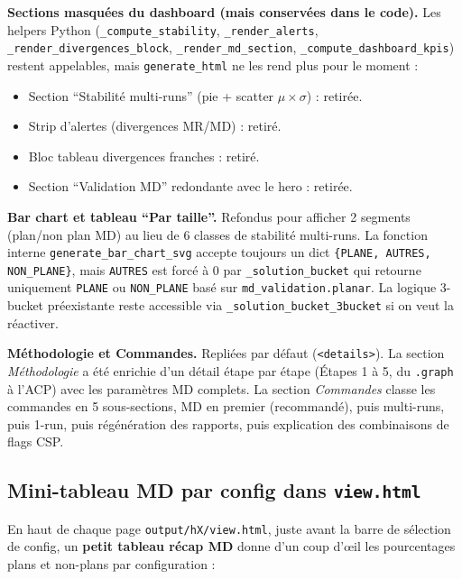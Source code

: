 \documentclass[12pt,a4paper]{article}
\theoremstyle{definition}
\newcommand{\dateblock}[1]{%
  \par\medskip
  \begingroup
    \setlength{\fboxsep}{4pt}%
    \fcolorbox{primary}{blue!5}{%
      \color{primary}\footnotesize\bfseries
      \textsc{Ajout du #1}%
    }%
  \endgroup
  \par\smallskip
}
\begin{document}
\textbf{Sections masquées du dashboard (mais conservées dans le code).}
Les helpers Python (\texttt{\_compute\_stability}, \texttt{\_render\_alerts},
\texttt{\_render\_divergences\_block}, \texttt{\_render\_md\_section},
\texttt{\_compute\_dashboard\_kpis}) restent appelables, mais
\texttt{generate\_html} ne les rend plus pour le moment :

\begin{itemize}
  \item Section ``Stabilité multi-runs'' (pie + scatter $\mu \times \sigma$) : retirée.
  \item Strip d'alertes (divergences MR/MD) : retiré.
  \item Bloc tableau divergences franches : retiré.
  \item Section ``Validation MD'' redondante avec le hero : retirée.
\end{itemize}

\textbf{Bar chart et tableau ``Par taille''.} Refondus pour afficher 2 segments
(plan/non plan MD) au lieu de 6 classes de stabilité multi-runs. La fonction interne
\texttt{generate\_bar\_chart\_svg} accepte toujours un dict \texttt{\{PLANE, AUTRES, NON\_PLANE\}},
mais \texttt{AUTRES} est forcé à 0 par \texttt{\_solution\_bucket} qui retourne
uniquement \texttt{PLANE} ou \texttt{NON\_PLANE} basé sur \texttt{md\_validation.planar}.
La logique 3-bucket préexistante reste accessible via \texttt{\_solution\_bucket\_3bucket}
si on veut la réactiver.

\textbf{Méthodologie et Commandes.} Repliées par défaut (\texttt{<details>}). La section
\textit{Méthodologie} a été enrichie d'un détail étape par étape (Étapes 1 à 5, du
\texttt{.graph} à l'ACP) avec les paramètres MD complets. La section \textit{Commandes}
classe les commandes en 5 sous-sections, MD en premier (recommandé), puis multi-runs,
puis 1-run, puis régénération des rapports, puis explication des combinaisons de flags CSP.

\subsection{Mini-tableau MD par config dans \texttt{view.html}}

\dateblock{1\textsuperscript{er} mai 2026}

En haut de chaque page \texttt{output/hX/view.html}, juste avant la barre de sélection de
config, un \textbf{petit tableau récap MD} donne d'un coup d'\oe{}il les pourcentages plans
et non-plans par configuration :
\end{document}
